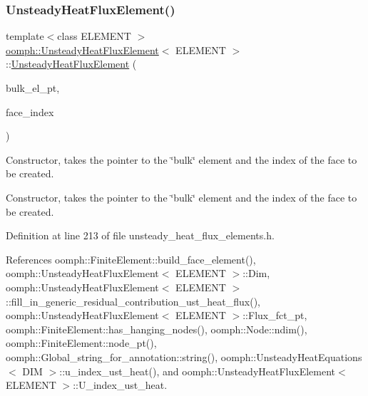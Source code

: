 \subsubsection{\texorpdfstring{Unsteady\+Heat\+Flux\+Element()}{UnsteadyHeatFluxElement()}\hspace{0.1cm}{\footnotesize\ttfamily [1/2]}}
{\footnotesize\ttfamily template$<$class E\+L\+E\+M\+E\+NT $>$ \\
\hyperlink{classoomph_1_1UnsteadyHeatFluxElement}{oomph\+::\+Unsteady\+Heat\+Flux\+Element}$<$ E\+L\+E\+M\+E\+NT $>$\+::\hyperlink{classoomph_1_1UnsteadyHeatFluxElement}{Unsteady\+Heat\+Flux\+Element} (\begin{DoxyParamCaption}\item[{\hyperlink{classoomph_1_1FiniteElement}{Finite\+Element} $\ast$const \&}]{bulk\+\_\+el\+\_\+pt,  }\item[{const int \&}]{face\+\_\+index }\end{DoxyParamCaption})}



Constructor, takes the pointer to the \char`\"{}bulk\char`\"{} element and the index of the face to be created. 

Constructor, takes the pointer to the \char`\"{}bulk\char`\"{} element and the index of the face to be created. 

Definition at line 213 of file unsteady\+\_\+heat\+\_\+flux\+\_\+elements.\+h.



References oomph\+::\+Finite\+Element\+::build\+\_\+face\+\_\+element(), oomph\+::\+Unsteady\+Heat\+Flux\+Element$<$ E\+L\+E\+M\+E\+N\+T $>$\+::\+Dim, oomph\+::\+Unsteady\+Heat\+Flux\+Element$<$ E\+L\+E\+M\+E\+N\+T $>$\+::fill\+\_\+in\+\_\+generic\+\_\+residual\+\_\+contribution\+\_\+ust\+\_\+heat\+\_\+flux(), oomph\+::\+Unsteady\+Heat\+Flux\+Element$<$ E\+L\+E\+M\+E\+N\+T $>$\+::\+Flux\+\_\+fct\+\_\+pt, oomph\+::\+Finite\+Element\+::has\+\_\+hanging\+\_\+nodes(), oomph\+::\+Node\+::ndim(), oomph\+::\+Finite\+Element\+::node\+\_\+pt(), oomph\+::\+Global\+\_\+string\+\_\+for\+\_\+annotation\+::string(), oomph\+::\+Unsteady\+Heat\+Equations$<$ D\+I\+M $>$\+::u\+\_\+index\+\_\+ust\+\_\+heat(), and oomph\+::\+Unsteady\+Heat\+Flux\+Element$<$ E\+L\+E\+M\+E\+N\+T $>$\+::\+U\+\_\+index\+\_\+ust\+\_\+heat.

\mbox{\label{classoomph_1_1UnsteadyHeatFluxElement_abbd32edae63a565d7666981421dd5d90}} 
